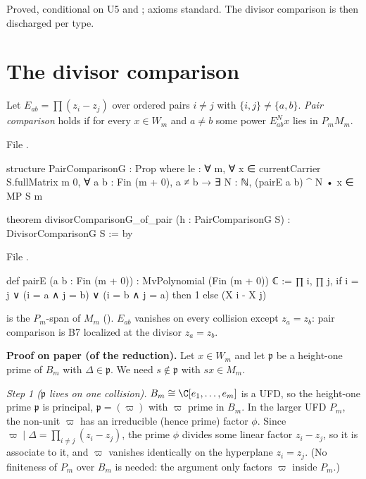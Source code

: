 \begin{status}
Proved, conditional on U5 and ; axioms standard. The divisor comparison is then
discharged per type.
\end{status}

\section{The divisor comparison}\label{l24:sec:divisor}

\begin{definition}\label{l24:def:pair}
Let $E_{ab}=\prod(z_i-z_j)$ over ordered pairs $i\neq j$ with $\{i,j\}\neq\{a,b\}$. \emph{Pair comparison} holds if for
every $x\in W_m$ and $a\neq b$ some power $E_{ab}^N x$ lies in $P_mM_m$.
\end{definition}
\noindent File .
\begin{leancode}
structure PairComparisonG : Prop where
  le : ∀ m, ∀ x ∈ currentCarrier S.fullMatrix m 0, ∀ a b : Fin (m + 0), a ≠ b →
    ∃ N : ℕ, (pairE a b) ^ N • x ∈ MP S m

theorem divisorComparisonG_of_pair (h : PairComparisonG S) : DivisorComparisonG S := by
\end{leancode}
\noindent File .
\begin{leancode}
def pairE (a b : Fin (m + 0)) : MvPolynomial (Fin (m + 0)) ℂ :=
  ∏ i, ∏ j, if i = j ∨ (i = a ∧ j = b) ∨ (i = b ∧ j = a) then 1 else (X i - X j)
\end{leancode}

\begin{dictionary}
 is the $P_m$-span of $M_m$ (). $E_{ab}$ vanishes on every
collision except $z_a=z_b$: pair comparison is B7 localized at the divisor $z_a=z_b$.
\end{dictionary}

\textbf{Proof on paper (of the reduction).} Let $x\in W_m$ and let $\mathfrak p$ be a height-one prime of $B_m$ with
$\Delta\in\mathfrak p$. We need $s\notin\mathfrak p$ with $sx\in M_m$.

\emph{Step 1 ($\mathfrak p$ lives on one collision).} $B_m\cong\C[e_1,\dots,e_m]$ is a UFD, so the height-one prime $\mathfrak p$ is
principal, $\mathfrak p=(\varpi)$ with $\varpi$ prime in $B_m$. In the larger UFD $P_m$, the non-unit $\varpi$ has an irreducible
(hence prime) factor $\phi$. Since $\varpi\mid\Delta=\prod_{i\neq j}(z_i-z_j)$, the prime $\phi$ divides some linear factor
$z_i-z_j$, so it is associate to it, and $\varpi$ vanishes identically on the hyperplane $z_i=z_j$. (No finiteness of $P_m$
over $B_m$ is needed: the argument only factors $\varpi$ inside $P_m$.)

